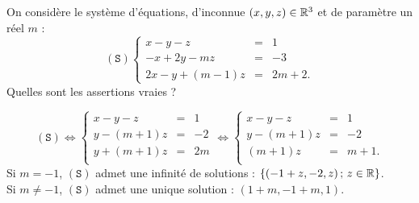 \begin{question}
On considère le système d'équations, d'inconnue $(x,y,z)\in \mathbb{R}^3$ et de paramètre un réel $m$ :
$$(\mathtt{S})\left\{\begin{array}{rcc}
x-y-z&=&1\\ -x+2y-mz&=&-3\\ 2x-y+(m-1)z&=&2m+2.\end{array}\right.$$
Quelles sont les assertions vraies ?
\begin{answers}  
\end{answers}
\begin{explanations} 
$$(\mathtt{S}) \Leftrightarrow  
\left\{\begin{array}{rcc}
x-y-z&=&1\\
y-(m+1)z&=&-2\\ 
y+(m+1)z&=&2m\\ 
\end{array}\right.  \Leftrightarrow  
\left\{\begin{array}{rcc}
x-y-z&=&1\\
y-(m+1)z&=&-2\\ 
(m+1)z&=&m+1.\\ 
\end{array}\right.$$
Si $m=-1$, $(\mathtt{S})$ admet une infinité de solutions : $\{(-1+z,-2,z) \, ; \, z \in \mathbb{R}\}$.\\
Si $m \neq -1$, $(\mathtt{S})$ admet une unique solution : $(1+m,-1+m,1)$.
\end{explanations}
\end{question}

